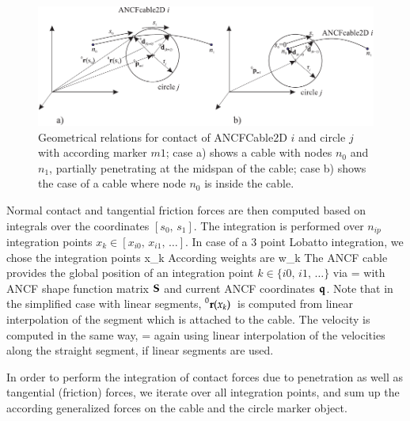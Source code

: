 \begin{figure}[tbph]
  \begin{center}
  \includegraphics[width=\textwidth]{figures/generalContactANCF2Dcircle}
  \end{center}
  \caption{Geometrical relations for contact of ANCFCable2D $i$ and circle $j$ with according marker $m1$; case a) shows a cable with nodes $n_0$ and $n_1$, partially penetrating at the midspan of the cable; case b) shows the case of a cable where node $n_0$ is inside the cable.}
	\label{fig_generalContactANCF2Dcircle}
\end{figure}
\newcommand{\ANCFdk}{\LU{0}{\dv_k}}
\newcommand{\ANCFdkt}{\LU{0}{\dot\dv_k}}
\newcommand{\ANCFdkO}{\LU{0}{\dv_{0,k}}}
\newcommand{\ANCFdkOtp}{\LU{0}{\dv_{0,k}\tp}}
\newcommand{\diffANCFdk}{\diffANCFmI{\ANCFdk}}

Normal contact and tangential friction forces are then computed based on integrals over the coordinates $[s_0,\, s_1]$.
The integration is performed over $n_{ip}$ integration points $x_k \in [x_{i0},\, x_{i1},\, \ldots]$. In case of a 3 point Lobatto integration, we chose the integration points 
\be
  x_k \in [s_0, (s_0+s_1)/2, s_1] \eqDot
\ee
According weights are
\be
  w_k \in [1/3, 4/3, 1/3] \eqDot
\ee
The ANCF cable provides the global position of an integration point $k \in \{i0,\, i1,\, \ldots\}$ via
\be
   =  \qv
\ee
with ANCF shape function matrix $\mathbf{S}$ and current ANCF coordinates $\mathbf{q}$.
Note that in the simplified case with linear segments, $\prescript{0}{}{\mathbf{r}(x_{k})}\,$ is computed from linear interpolation of the segment which is attached to the cable.
The velocity is computed in the same way,
\be
   =  \dot\qv
\ee
again using linear interpolation of the velocities along the straight segment, if linear segments are used.

In order to perform the integration of contact forces due to penetration as well as tangential (friction) forces, we iterate over all integration points, and sum up the according generalized forces on the cable and the circle marker object.

